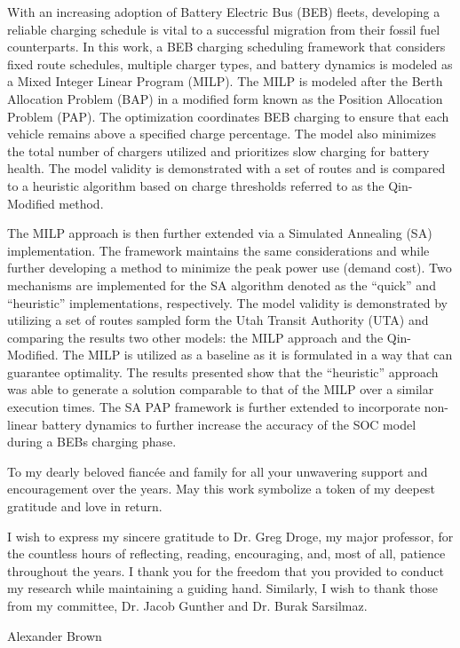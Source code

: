 \documentclass[ee,thesis]{usuthesis}
\begin{document}
\begin{publicabstract}

With an increasing adoption of Battery Electric Bus (BEB) fleets, developing a reliable charging schedule is vital to a successful migration from their fossil fuel counterparts. In this work, a BEB charging scheduling framework that considers fixed route schedules, multiple charger types, and battery dynamics is modeled as a Mixed Integer Linear Program (MILP). The MILP is modeled after the Berth Allocation Problem (BAP) in a modified form known as the Position Allocation Problem (PAP). The optimization coordinates BEB charging to ensure that each vehicle remains above a specified charge percentage. The model also minimizes the total number of chargers utilized and prioritizes slow charging for battery health. The model validity is demonstrated with a set of routes and is compared to a heuristic algorithm based on charge thresholds referred to as the Qin-Modified method.

The MILP approach is then further extended via a Simulated Annealing (SA) implementation. The framework maintains the same considerations and while further developing a method to minimize the peak power use (demand cost). Two mechanisms are implemented for the SA algorithm denoted as the ``quick'' and ``heuristic'' implementations, respectively. The model validity is demonstrated by utilizing a set of routes sampled form the Utah Transit Authority (UTA) and comparing the results two other models: the MILP approach and the Qin-Modified. The MILP is utilized as a baseline as it is formulated in a way that can guarantee optimality. The results presented show that the ``heuristic'' approach was able to generate a solution comparable to that of the MILP over a similar execution times. The SA PAP framework is further extended to incorporate non-linear battery dynamics to further increase the accuracy of the SOC model during a BEBs charging phase.
\end{publicabstract}

\begin{dedication}
To my dearly beloved fiancée and family for all your unwavering support and encouragement over the years. May this work symbolize a token of my deepest gratitude and love in return.

%
\end{dedication}
\begin{acknowledgments}
I wish to express my sincere gratitude to Dr. Greg Droge, my major professor, for the countless hours of reflecting, reading, encouraging, and, most of all, patience throughout the years. I thank you for the freedom that you provided to conduct my research while maintaining a guiding hand. Similarly, I wish to thank those from my committee, Dr. Jacob Gunther and Dr. Burak Sarsilmaz.
\\
\begin{flushright}
Alexander Brown
\end{flushright}
\end{acknowledgments}
\end{document}
